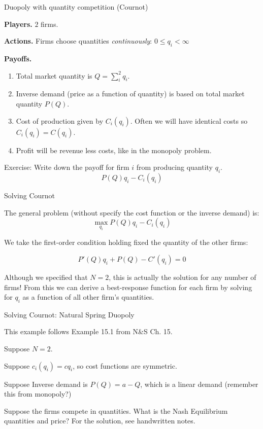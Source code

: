 \documentclass[aspectratio=169]{beamer}
\newenvironment{wideitemize}{\itemize\addtolength{\itemsep}{10pt}}{\enditemize}
\begin{document}
\begin{frame}{Duopoly with quantity competition (Cournot)}
\begin{wideitemize}
    \item \textbf{Players.} $2$ firms.
    \item \textbf{Actions.} Firms choose quantities \textit{continuously}: $0\leq q_i < \infty$
    \item \textbf{Payoffs.} 
    \begin{enumerate}
        \item Total market quantity is $Q= \sum_i^2q_i$.
        \item Inverse demand (price as a function of quantity) is based on total market quantity $P(Q)$.
        \item Cost of production given by $C_i(q_i)$. Often we will have identical costs so $C_i(q_i)=C(q_i)$.
        \item Profit will be revenue less costs, like in the monopoly problem.
    \end{enumerate}
    \item Exercise: Write down the payoff for firm $i$ from producing quantity $q_i$.\pause
    \[P(Q)q_i-C_i(q_i)\]
\end{wideitemize}
\end{frame}

\begin{frame}{Solving Cournot}

The general problem (without specify the cost function or the inverse demand) is:
\[\max_{q_i} P(Q)q_i-C_i(q_i) \]

We take the first-order condition holding fixed the quantity of the other firms:

\[P'(Q)q_i + P(Q)-C'(q_i)=0\]



Although we specified that $N=2$, this is actually the solution for any number of firms! From this we can derive a best-response function for each firm by solving for $q_i$ as a function of all other firm's quantities.

\end{frame}

\begin{frame}{Solving Cournot: Natural Spring Duopoly}

This example follows Example 15.1 from N\&S Ch. 15.
\begin{wideitemize}
    \item Suppose $N=2$.
    \item Suppose $c_i(q_i)=cq_i$, so cost functions are symmetric.
    \item Suppose Inverse demand is $P(Q)=a-Q$, which is a linear demand (remember this from monopoly?)
    \item Suppose the firms compete in quantities. What is the Nash Equilibrium quantities and price?
\end{wideitemize}
For the solution, see handwritten notes.
\end{frame}
\end{document}
